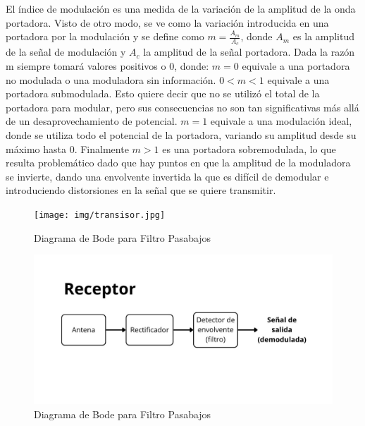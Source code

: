 El índice de modulación es una medida de la variación de la amplitud de la onda portadora. Visto de otro modo, se ve como la variación 
introducida en una portadora por la modulación y se define como $m = \frac{A_m}{A_c}$, donde $A_m$ es la amplitud de la señal de 
modulación y $A_c$ la amplitud de la señal portadora. Dada la razón m siempre tomará valores positivos o 0, donde: $m=0$ equivale a una 
portadora no modulada o una moduladora sin información. $0<m<1$ equivale a una portadora submodulada. Esto quiere decir que no se utilizó 
el total de la portadora para modular, pero sus consecuencias no son tan significativas más allá de un desaprovechamiento de potencial. 
$m=1$ equivale a una modulación ideal, donde se utiliza todo el potencial de la portadora, variando su amplitud desde su máximo hasta 0. 
Finalmente $m>1$ es una portadora sobremodulada, lo que resulta problemático dado que hay puntos en que la amplitud de la moduladora se 
invierte, dando una envolvente invertida la que es difícil de demodular e introduciendo distorsiones en la señal que se quiere 
transmitir.


\begin{figure}[h!]
    \centering
    \texttt{[image: img/transisor.jpg]}
    \caption{Diagrama de Bode para Filtro Pasabajos}
    \label{fig:bode_butter}
\end{figure}

\begin{figure}[h!]
    \centering
    \includegraphics[width=0.75\linewidth]{img/receptor.jpg}
    \caption{Diagrama de Bode para Filtro Pasabajos}
    \label{fig:bode_butter}
\end{figure}
